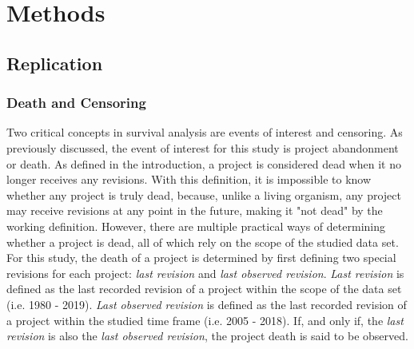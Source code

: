 \documentclass[acmconf]{acmart}
\begin{document}

\section{Methods} \label{methods}

\subsection{Replication} \label{replmethods}
\subsubsection{Death and Censoring} \label{death_censoring}

Two critical concepts in survival analysis are events of interest and censoring.
As previously discussed, the event of interest for this study is project abandonment or death.
As defined in the introduction, a project is considered dead when it no longer receives any revisions.
With this definition, it is impossible to know whether any project is truly dead, because, unlike a living organism, any project may receive revisions at any point in the future, making it "not dead" by the working definition.
However, there are multiple practical ways of determining whether a project is dead, all of which rely on the scope of the studied data set.
For this study, the death of a project is determined by first defining two special revisions for each project: \emph{last revision} and \emph{last observed revision}. 
\emph{Last revision} is defined as the last recorded revision of a project within the scope of the data set (i.e. 1980 - 2019). 
\emph{Last observed revision} is defined as the last recorded revision of a project within the studied time frame (i.e. 2005 - 2018). 
If, and only if, the \emph{last revision} is also the \emph{last observed revision}, the project death is said to be observed. 
\end{document}
